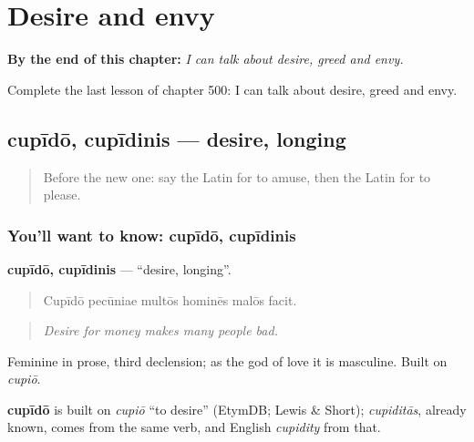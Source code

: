 
\chapter{Desire and envy}
\label{ch:la-desire-and-envy}

\begin{chapteropening}
\textbf{By the end of this chapter:} \emph{I can talk about desire, greed and envy.}

Complete the last lesson of chapter 500: I can talk about desire, greed and envy.
\end{chapteropening}

\section[cupīdō, cupīdinis]{cupīdō, cupīdinis — desire, longing}

\label{lesson:LA-C500-cupido}



\begin{quote}
Before the new one: say the Latin for to amuse, then the Latin for to please.
\end{quote}

\subsection*{You'll want to know: cupīdō, cupīdinis}
\textbf{cupīdō, cupīdinis} — \textquotedblleft{}desire, longing\textquotedblright{}.

\begin{quote}
Cupīdō pecūniae multōs hominēs malōs facit.
\end{quote}

\begin{quote}
\emph{Desire for money makes many people bad.}
\end{quote}

Feminine in prose, third declension; as the god of love it is masculine. Built on \emph{cupiō}.

\begin{cousinweb}
\textbf{cupīdō} is built on \emph{cupiō} \textquotedblleft{}to desire\textquotedblright{} (EtymDB; Lewis \& Short); \emph{cupiditās}, already known, comes from the same verb, and English \emph{cupidity} from that.
\end{cousinweb}

